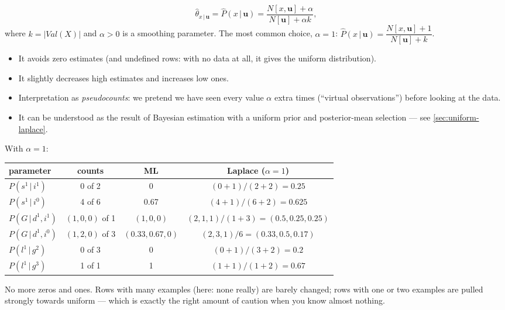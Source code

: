 \documentclass[11pt, oneside]{book}
\newcommand{\Prob}{\mathbb{P}}           %
\newcommand{\given}{\,\vert\,}           %
\newcommand{\Val}{\mathit{Val}}          %
\begin{document}
\begin{thmbox}[title={Laplace correction (additive smoothing)}, unbreakable]
\[
\hat\theta_{x \given \mathbf{u}} = \hat P(x \given \mathbf{u}) = \frac{N[x, \mathbf{u}] + \alpha}{N[\mathbf{u}] + \alpha k},
\]
where $k = |\Val(X)|$ and $\alpha > 0$ is a smoothing parameter. The most
common choice, $\alpha = 1$: $\hat P(x \given \mathbf{u}) = \dfrac{N[x, \mathbf{u}] + 1}{N[\mathbf{u}] + k}$.
\end{thmbox}

\begin{itemize}
  \item It avoids zero estimates (and undefined rows: with no data at all, it
    gives the uniform distribution).
  \item It slightly decreases high estimates and increases low ones.
  \item Interpretation as \emph{pseudocounts}: we pretend we have seen every
    value $\alpha$ extra times (``virtual observations'') before looking at the
    data.
  \item It can be understood as the result of Bayesian estimation with a uniform
    prior and posterior-mean selection --- see \cref{sec:uniform-laplace}.
\end{itemize}

\begin{exbox}[title={Laplace-smoothed CPDs for the eight student rows}]
With $\alpha = 1$:
\begin{center}
\small
\begin{tabular}{@{}lccc@{}}
\toprule
parameter & counts & ML & Laplace ($\alpha = 1$) \\
\midrule
$P(s^1 \given i^1)$ & 0 of 2 & 0 & $(0+1)/(2+2) = 0.25$ \\
$P(s^1 \given i^0)$ & 4 of 6 & 0.67 & $(4+1)/(6+2) = 0.625$ \\
$P(G \given d^1, i^1)$ & $(1, 0, 0)$ of 1 & $(1, 0, 0)$ & $(2, 1, 1)/(1+3) = (0.5, 0.25, 0.25)$ \\
$P(G \given d^1, i^0)$ & $(1, 2, 0)$ of 3 & $(0.33, 0.67, 0)$ & $(2, 3, 1)/6 = (0.33, 0.5, 0.17)$ \\
$P(l^1 \given g^2)$ & 0 of 3 & 0 & $(0+1)/(3+2) = 0.2$ \\
$P(l^1 \given g^3)$ & 1 of 1 & 1 & $(1+1)/(1+2) = 0.67$ \\
\bottomrule
\end{tabular}
\end{center}
No more zeros and ones. Rows with many examples (here: none really) are barely
changed; rows with one or two examples are pulled strongly towards uniform ---
which is exactly the right amount of caution when you know almost nothing.
\end{exbox}
\end{document}
